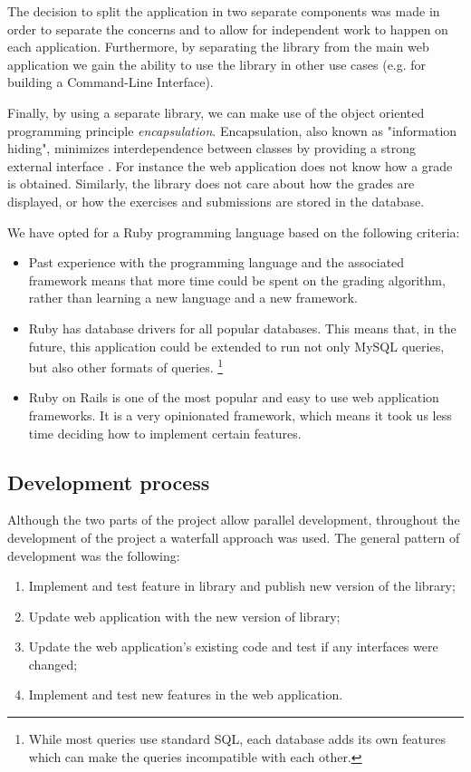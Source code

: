 The decision to split the application in two separate components was made in order to separate the concerns and to allow for independent work to happen on each application. Furthermore, by separating the library from the main web application we gain the ability to use the library in other use cases (e.g. for building a Command-Line Interface).

Finally, by using a separate library, we can make use of the object oriented programming principle \textit{encapsulation}. Encapsulation, also known as "information hiding", minimizes interdependence between classes by providing a strong external interface \citep{Encapsulation}. For instance the web application does not know how a grade is obtained. Similarly, the library does not care about how the grades are displayed, or how the exercises and submissions are stored in the database.

We have opted for a Ruby programming language based on the following criteria:

\begin{itemize}
    \item Past experience with the programming language and the associated framework means that more time could be spent on the grading algorithm, rather than learning a new language and a new framework.
    \item Ruby has database drivers for all popular databases. This means that, in the future, this application could be extended to run not only MySQL queries, but also other formats of queries. \footnote{While most queries use standard SQL, each database adds its own features which can make the queries incompatible with each other.}
    \item Ruby on Rails is one of the most popular and easy to use web application frameworks. It is a very opinionated framework, which means it took us less time deciding how to implement certain features.
\end{itemize}

\subsection{Development process} \label{ch:reqandspec:sec:spec:subsec:dev_process}

Although the two parts of the project allow parallel development, throughout the development of the project a waterfall approach was used. The general pattern of development was the following:

\begin{enumerate}
  \item Implement and test feature in library and publish new version of the library;
  \item Update web application with the new version of library;
  \item Update the web application's existing code and test if any interfaces were changed;
  \item Implement and test new features in the web application.
\end{enumerate}

